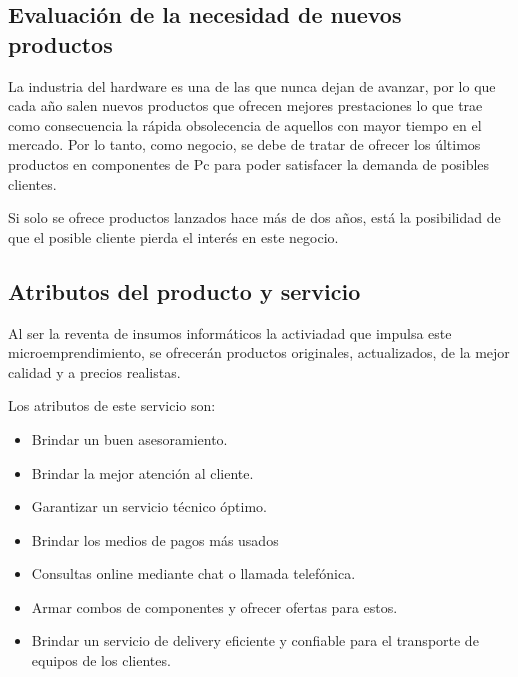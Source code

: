 \documentclass[11pt,a4paper]{article}
\begin{document}
\subsection{Evaluación de la necesidad de nuevos productos}
La industria del hardware es una de las que nunca dejan de avanzar, por lo que cada año salen nuevos productos que ofrecen mejores prestaciones lo que trae como consecuencia la rápida obsolecencia de aquellos con mayor tiempo en el mercado. Por lo tanto, como negocio, se debe de tratar de ofrecer los últimos productos en componentes de Pc para poder satisfacer la demanda de posibles clientes.

Si solo se ofrece productos lanzados hace más de dos años, está la posibilidad de que el posible cliente pierda el interés en este negocio.

\subsection{Atributos del producto y servicio}
Al ser la reventa de insumos informáticos la activiadad que impulsa este microemprendimiento, se ofrecerán productos originales, actualizados, de la mejor calidad y a precios realistas.

Los atributos de este servicio son:
\begin{itemize}
    \item Brindar un buen asesoramiento.%
    \item Brindar la mejor atención al cliente.
    \item Garantizar un servicio técnico óptimo.
    \item Brindar los medios de pagos más usados
    \item Consultas online mediante chat o llamada telefónica.
    \item Armar combos de componentes y ofrecer ofertas para estos.
    \item Brindar un servicio de delivery eficiente y confiable para el transporte de equipos de los clientes.
\end{itemize}
\end{document}
